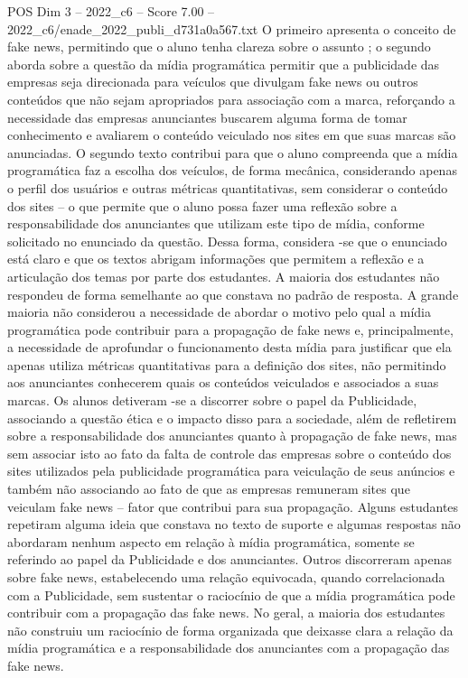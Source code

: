 \begin{textsample}{POS Dim 3 – 2022\_c6 – Score 7.00 – 2022\_c6/enade\_2022\_publi\_d731a0a567.txt}
O primeiro apresenta o conceito de fake news, permitindo que o aluno tenha clareza sobre o assunto ; o segundo aborda sobre a questão da mídia programática permitir que a publicidade das empresas seja direcionada para veículos que divulgam fake news ou outros conteúdos que não sejam apropriados para associação com a marca, reforçando a necessidade das empresas anunciantes buscarem alguma forma de tomar conhecimento e avaliarem o conteúdo veiculado nos sites em que suas marcas são anunciadas.
O segundo texto contribui para que o aluno compreenda que a mídia programática faz a escolha dos veículos, de forma mecânica, considerando apenas o perfil dos usuários e outras métricas quantitativas, sem considerar o conteúdo dos sites – o que permite que o aluno possa fazer uma reflexão sobre a responsabilidade dos anunciantes que utilizam este tipo de mídia, conforme solicitado no enunciado da questão.
Dessa forma, considera -se que o enunciado está claro e que os textos abrigam informações que permitem a reflexão e a articulação dos temas por parte dos estudantes.
A maioria dos estudantes não respondeu de forma semelhante ao que constava no padrão de resposta.
A grande maioria não considerou a necessidade de abordar o motivo pelo qual a mídia programática pode contribuir para a propagação de fake news e, principalmente, a necessidade de aprofundar o funcionamento desta mídia para justificar que ela apenas utiliza métricas quantitativas para a definição dos sites, não permitindo aos anunciantes conhecerem quais os conteúdos veiculados e associados a suas marcas.
Os alunos detiveram -se a discorrer sobre o papel da Publicidade, associando a questão ética e o impacto disso para a sociedade, além de refletirem sobre a responsabilidade dos anunciantes quanto à propagação de fake news, mas sem associar isto ao fato da falta de controle das empresas sobre o conteúdo dos sites utilizados pela publicidade programática para veiculação de seus anúncios e também não associando ao fato de que as empresas remuneram sites que veiculam fake news – fator que contribui para sua propagação.
Alguns estudantes repetiram alguma ideia que constava no texto de suporte e algumas respostas não abordaram nenhum aspecto em relação à mídia programática, somente se referindo ao papel da Publicidade e dos anunciantes.
Outros discorreram apenas sobre fake news, estabelecendo uma relação equivocada, quando correlacionada com a Publicidade, sem sustentar o raciocínio de que a mídia programática pode contribuir com a propagação das fake news.
No geral, a maioria dos estudantes não construiu um raciocínio de forma organizada que deixasse clara a relação da mídia programática e a responsabilidade dos anunciantes com a propagação das fake news.

\end{textsample}
